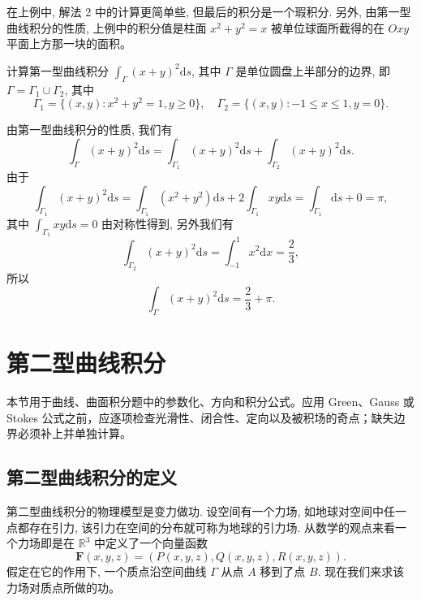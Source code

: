 \documentclass[UTF8,12pt,a4paper,fontset=fandol]{ctexart}
\begin{document}
\begin{remark}\quad 在上例中, 解法 2 中的计算更简单些, 但最后的积分是一个瑕积分. 另外, 由第一型曲线积分的性质, 上例中的积分值是柱面 $x^2+y^2=x$ 被单位球面所截得的在 $Oxy$ 平面上方那一块的面积。

\end{remark}
\begin{example}\label{course-example-16-1-2}\quad 计算第一型曲线积分 $\int_\Gamma (x+y)^2\mathrm ds$, 其中 $\Gamma$ 是单位圆盘上半部分的边界, 即 $\Gamma=\Gamma_1\cup\Gamma_2$, 其中
\[
  \Gamma_1=\{(x,y):x^2+y^2=1,y\geqslant0\},\quad
  \Gamma_2=\{(x,y):-1\leqslant x\leqslant1,y=0\}.
\]

\end{example}
\begin{solve}\quad 由第一型曲线积分的性质, 我们有
\[
  \int_\Gamma (x+y)^2\mathrm ds
  =\int_{\Gamma_1}(x+y)^2\mathrm ds+\int_{\Gamma_2}(x+y)^2\mathrm ds.
\]
由于
\[
  \int_{\Gamma_1}(x+y)^2\mathrm ds
  =\int_{\Gamma_1}(x^2+y^2)\mathrm ds+2\int_{\Gamma_1}xy\mathrm ds
  =\int_{\Gamma_1}\mathrm ds+0=\pi,
\]
其中 $\int_{\Gamma_1}xy\mathrm ds=0$ 由对称性得到, 另外我们有
\[
  \int_{\Gamma_2}(x+y)^2\mathrm ds
  =\int_{-1}^1 x^2\mathrm dx=\frac23,
\]
所以
\[
  \int_\Gamma (x+y)^2\mathrm ds=\frac23+\pi.
\]

\end{solve}


\section{第二型曲线积分}\label{course-16-2}
本节用于曲线、曲面积分题中的参数化、方向和积分公式。应用 Green、Gauss 或 Stokes 公式之前，应逐项检查光滑性、闭合性、定向以及被积场的奇点；缺失边界必须补上并单独计算。

\subsection{第二型曲线积分的定义}

第二型曲线积分的物理模型是变力做功. 设空间有一个力场, 如地球对空间中任一点都存在引力, 该引力在空间的分布就可称为地球的引力场. 从数学的观点来看一个力场即是在 $\mathbb R^3$ 中定义了一个向量函数
\[
  \boldsymbol F(x,y,z)=(P(x,y,z),Q(x,y,z),R(x,y,z)).
\]
假定在它的作用下, 一个质点沿空间曲线 $\Gamma$ 从点 $A$ 移到了点 $B$. 现在我们来求该力场对质点所做的功。
\end{document}
